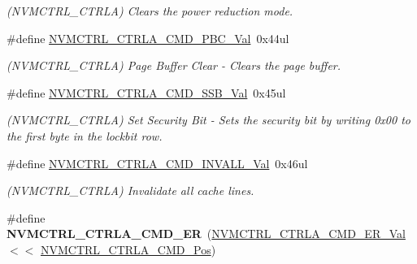 \begin{DoxyCompactItemize}
\begin{DoxyCompactList}\small\item\em (N\+V\+M\+C\+T\+R\+L\+\_\+\+C\+T\+R\+L\+A) Clears the power reduction mode. \end{DoxyCompactList}\item 
\hypertarget{group___s_a_m_l21___n_v_m_c_t_r_l_gaa88d2aeae32e10443a0e9dc516dfbf44}{}\#define \hyperlink{group___s_a_m_l21___n_v_m_c_t_r_l_gaa88d2aeae32e10443a0e9dc516dfbf44}{N\+V\+M\+C\+T\+R\+L\+\_\+\+C\+T\+R\+L\+A\+\_\+\+C\+M\+D\+\_\+\+P\+B\+C\+\_\+\+Val}~0x44ul\label{group___s_a_m_l21___n_v_m_c_t_r_l_gaa88d2aeae32e10443a0e9dc516dfbf44}

\begin{DoxyCompactList}\small\item\em (N\+V\+M\+C\+T\+R\+L\+\_\+\+C\+T\+R\+L\+A) Page Buffer Clear -\/ Clears the page buffer. \end{DoxyCompactList}\item 
\hypertarget{group___s_a_m_l21___n_v_m_c_t_r_l_ga9192307a9292a8144f18adfe8ea0d3f0}{}\#define \hyperlink{group___s_a_m_l21___n_v_m_c_t_r_l_ga9192307a9292a8144f18adfe8ea0d3f0}{N\+V\+M\+C\+T\+R\+L\+\_\+\+C\+T\+R\+L\+A\+\_\+\+C\+M\+D\+\_\+\+S\+S\+B\+\_\+\+Val}~0x45ul\label{group___s_a_m_l21___n_v_m_c_t_r_l_ga9192307a9292a8144f18adfe8ea0d3f0}

\begin{DoxyCompactList}\small\item\em (N\+V\+M\+C\+T\+R\+L\+\_\+\+C\+T\+R\+L\+A) Set Security Bit -\/ Sets the security bit by writing 0x00 to the first byte in the lockbit row. \end{DoxyCompactList}\item 
\hypertarget{group___s_a_m_l21___n_v_m_c_t_r_l_ga0bef792b0234a40587a3dd7254e1764d}{}\#define \hyperlink{group___s_a_m_l21___n_v_m_c_t_r_l_ga0bef792b0234a40587a3dd7254e1764d}{N\+V\+M\+C\+T\+R\+L\+\_\+\+C\+T\+R\+L\+A\+\_\+\+C\+M\+D\+\_\+\+I\+N\+V\+A\+L\+L\+\_\+\+Val}~0x46ul\label{group___s_a_m_l21___n_v_m_c_t_r_l_ga0bef792b0234a40587a3dd7254e1764d}

\begin{DoxyCompactList}\small\item\em (N\+V\+M\+C\+T\+R\+L\+\_\+\+C\+T\+R\+L\+A) Invalidate all cache lines. \end{DoxyCompactList}\item 
\hypertarget{group___s_a_m_l21___n_v_m_c_t_r_l_gaaecf1953d86bef9ad9bef7309493954d}{}\#define {\bfseries N\+V\+M\+C\+T\+R\+L\+\_\+\+C\+T\+R\+L\+A\+\_\+\+C\+M\+D\+\_\+\+E\+R}~(\hyperlink{group___s_a_m_l21___n_v_m_c_t_r_l_ga6c7936d9e4cd317170b54ffb5b3b428d}{N\+V\+M\+C\+T\+R\+L\+\_\+\+C\+T\+R\+L\+A\+\_\+\+C\+M\+D\+\_\+\+E\+R\+\_\+\+Val}      $<$$<$ \hyperlink{group___s_a_m_l21___n_v_m_c_t_r_l_ga5346c6f8ba695f7cadb7f07bde6e25f8}{N\+V\+M\+C\+T\+R\+L\+\_\+\+C\+T\+R\+L\+A\+\_\+\+C\+M\+D\+\_\+\+Pos})\label{group___s_a_m_l21___n_v_m_c_t_r_l_gaaecf1953d86bef9ad9bef7309493954d}


\end{DoxyCompactItemize}
